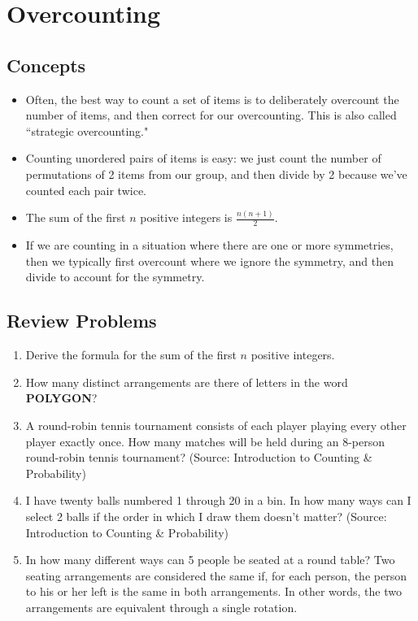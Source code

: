 \documentclass[12pt, letterpaper]{article}
\begin{document}
\setcounter{section}{2}
\section{Overcounting}

\subsection{Concepts}

\begin{itemize}
    \item Often, the best way to count a set of items is to deliberately overcount the number of items, and then correct for our overcounting. This is also called ``strategic overcounting."
    \item Counting unordered pairs of items is easy: we just count the number of permutations of 2 items from our group, and then divide by 2 because we've counted each pair twice.
    \item The sum of the first $n$ positive integers is $\frac{n(n+1)}{2}$.
    \item If we are counting in a situation where there are one or more symmetries, then we typically first overcount where we ignore the symmetry, and then divide to account for the symmetry.
\end{itemize}

\subsection{Review Problems}

\begin{enumerate}
    \item Derive the formula for the sum of the first $n$ positive integers.
    \item How many distinct arrangements are there of letters in the word \textbf{POLYGON}?
    \item A round-robin tennis tournament consists of each player playing every other player exactly once. How many matches will be held during an 8-person round-robin tennis tournament? (Source: Introduction to Counting \& Probability)
    \item I have twenty balls numbered 1 through 20 in a bin. In how many ways can I select 2 balls if the order in which I draw them doesn't matter? (Source: Introduction to Counting \& Probability)
    \item In how many different ways can 5 people be seated at a round table? Two seating arrangements are considered the same if, for each person, the person to his or her left is the same in both arrangements. In other words, the two arrangements are equivalent through a single rotation.
\end{enumerate}
\end{document}
